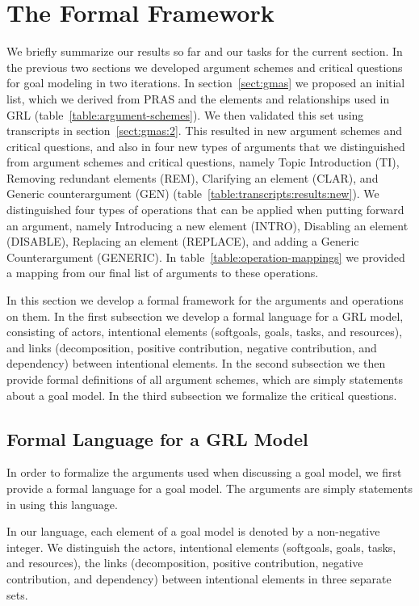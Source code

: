 \section{The Formal Framework}
\label{sect:formalframework}

We briefly summarize our results so far and our tasks for the current section. In the previous two sections we developed argument schemes and critical questions for goal modeling in two iterations. In section~\ref{sect:gmas} we proposed an initial list, which we derived from PRAS and the elements and relationships used in GRL (table~\ref{table:argument-schemes}). We then validated this set using transcripts in section~\ref{sect:gmas:2}. This resulted in new argument schemes and critical questions, and also in four new types of arguments that we distinguished from argument schemes and critical questions, namely Topic Introduction (TI), Removing redundant elements (REM), Clarifying an element (CLAR), and Generic counterargument (GEN) (table~\ref{table:transcripts:results:new}). We distinguished four types of operations that can be applied when putting forward an argument, namely Introducing a new element (INTRO), Disabling an element (DISABLE), Replacing an element (REPLACE), and adding a Generic Counterargument (GENERIC). In table~\ref{table:operation-mappings} we provided a mapping from our final list of arguments to these operations.

In this section we develop a formal framework for the arguments and operations on them. In the first subsection we develop a formal language for a GRL model, consisting of actors, intentional elements (softgoals, goals, tasks, and resources), and links (decomposition, positive contribution, negative contribution, and dependency) between intentional elements. In the second subsection we then provide formal definitions of all argument schemes, which are simply statements about a goal model. In the third subsection we formalize the critical questions.

\subsection{Formal Language for a GRL Model}

In order to formalize the arguments used when discussing a goal model, we first provide a formal language for a goal model. The arguments are simply statements in using this language.

In our language, each element of a goal model is denoted by a non-negative integer. We distinguish the actors, intentional elements (softgoals, goals, tasks, and resources), the links (decomposition, positive contribution, negative contribution, and dependency) between intentional elements in three separate sets.

